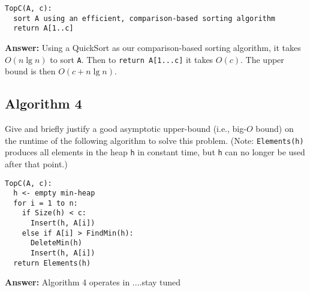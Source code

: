 \documentclass[11pt, oneside]{article}   	%
\theoremstyle{definition}
\theoremstyle{remark}
\begin{document}
\begin{verbatim}
TopC(A, c):
  sort A using an efficient, comparison-based sorting algorithm
  return A[1..c]
\end{verbatim}

\textbf{Answer: } Using a QuickSort as our comparison-based sorting algorithm, it takes $O(n \lg n)$ to sort \texttt{A}. Then to \texttt{return A[1...c]} it takes $O(c)$. The upper bound is then $O(c+n \lg n)$.  
\subsection{Algorithm 4}

Give and briefly justify a good asymptotic upper-bound (i.e., big-$O$
bound) on the runtime of the following algorithm to solve this
problem. (Note: \texttt{Elements(h)} produces all elements in the heap \texttt{h} in
constant time, but \texttt{h} can no longer be used after that point.)

\begin{verbatim}
TopC(A, c):
  h <- empty min-heap
  for i = 1 to n:
    if Size(h) < c:
      Insert(h, A[i])
    else if A[i] > FindMin(h):
      DeleteMin(h)
      Insert(h, A[i])
  return Elements(h)
\end{verbatim}

\textbf{Answer: } Algorithm 4 operates in ....stay tuned
\end{document}
